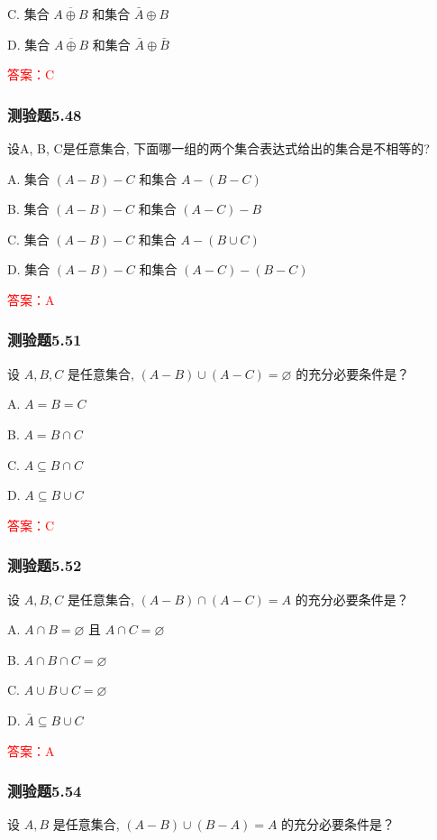 \documentclass[UTF8, heading=true]{ctexart}
\begin{document}
C. 集合 $\overline{A \oplus B}$ 和集合 $\bar{A} \oplus B$

D. 集合 $\overline{A \oplus B}$ 和集合 $\bar{A} \oplus \bar{B}$

\textcolor{red}{答案：C}

\subsubsection{测验题5.48}
设A, B, C是任意集合, 下面哪一组的两个集合表达式给出的集合是不相等的?

A. 
集合 $(A-B)-C$ 和集合 $A-(B-C)$

B. 
集合 $(A-B)-C$ 和集合 $(A-C)-B$

C. 
集合 $(A-B)-C$ 和集合 $A-(B \cup C)$

D. 
集合 $(A-B)-C$ 和集合 $(A-C)-(B-C)$

\textcolor{red}{答案：A}

\subsubsection{测验题5.51}

设 $A, B, C$ 是任意集合, $(A-B) \cup(A-C)=\varnothing$ 的充分必要条件是？

A. $A=B=C$

B. $A=B \cap C$

C. $A \subseteq B \cap C$

D. $A \subseteq B \cup C$

\textcolor{red}{答案：C}

\subsubsection{测验题5.52}

设 $A, B, C$ 是任意集合, $(A-B) \cap(A-C)=A$ 的充分必要条件是？

A. $A \cap B=\varnothing$ 且 $A \cap C=\varnothing$

B. $A \cap B \cap C=\varnothing$

C. $A \cup B \cup C=\varnothing$

D. $\bar{A} \subseteq B \cup C$

\textcolor{red}{答案：A}

\subsubsection{测验题5.54}

设 $A, B$ 是任意集合, $(A-B) \cup(B-A)=A$ 的充分必要条件是？
\end{document}
